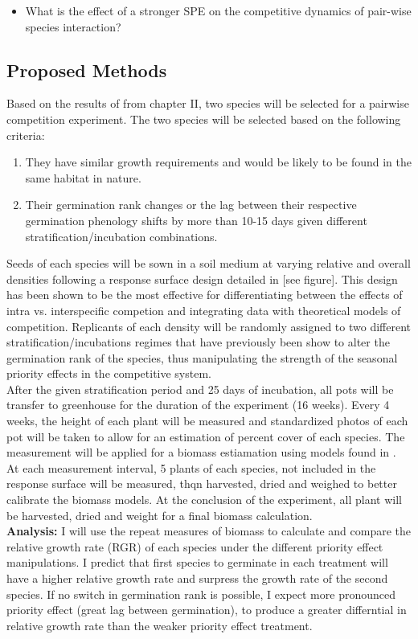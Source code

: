 \documentclass{article}\usepackage[]{graphicx}\usepackage[]{color}
\begin{document}
{\begin{itemize}
\item What is the effect of a stronger SPE on the competitive dynamics of pair-wise species interaction?
\end{itemize}
\subsection*{Proposed Methods}
\indent Based on the results of from chapter II, two species will be selected for a pairwise competition experiment. The two species will be selected based on the following criteria:
\begin{enumerate}
\item They have similar growth requirements and would be likely to be found in the same habitat in nature.
\item Their germination rank changes or the lag between their respective germination phenology shifts by more than 10-15 days given different stratification/incubation combinations.
\end{enumerate}
Seeds of each species will be sown in a soil medium at varying relative and overall densities following a response surface design detailed in \cite{Inouye2001} [see figure]. This design has been shown to be the most effective for differentiating between the effects of intra vs. interspecific competion and integrating data with theoretical models of competition.  Replicants of each density will be randomly assigned to two different stratification/incubations regimes that have previously been show to alter the germination rank of the species, thus manipulating the strength of the seasonal priority effects in the competitive system.\\
After the given stratification period and 25 days of incubation, all pots will be transfer to greenhouse for the duration of the experiment (16 weeks). Every 4 weeks, the height of each plant will be measured and standardized photos of each pot will be taken to allow for an estimation of percent cover of each species. The measurement will be applied for a biomass estiamation using models found in \citet{Axmanova2012}. At each measurement interval, 5 plants of each species, not included in the response surface will be measured, thqn harvested, dried and weighed to better calibrate the biomass models. At the conclusion of the experiment, all plant will be harvested, dried and weight for a final biomass calculation.\\
\textbf{Analysis:} I will use the repeat measures of biomass to calculate and compare the relative growth rate (RGR) \citep{Connolly2005} of each species under the different priority effect manipulations. I predict that first species to germinate in each treatment will have a higher relative growth rate and surpress the growth rate of the second species. If no switch in germination rank is possible, I expect more pronounced priority effect (great lag between germination), to produce a greater differntial in relative growth rate than the weaker priority effect treatment.\\  


}
\end{document}
